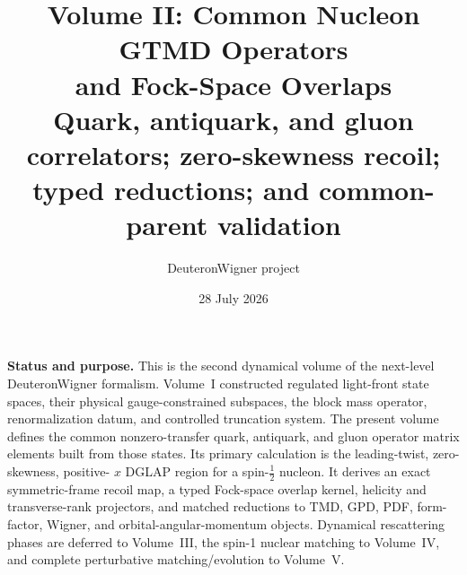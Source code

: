 \documentclass[11pt]{article}
\title{\vspace{-1.0cm}
{\color{navy}\bfseries Volume II: Common Nucleon GTMD Operators\\[2mm]
and Fock-Space Overlaps}\\[4mm]
\large Quark, antiquark, and gluon correlators; zero-skewness recoil;\\
typed reductions; and common-parent validation}
\author{DeuteronWigner project}
\date{28 July 2026}
\begin{document}
\maketitle

\begin{center}
\begin{minipage}{0.94\textwidth}
\colorbox{softblue}{\parbox{0.96\textwidth}{
\textbf{Status and purpose.}
This is the second dynamical volume of the next-level DeuteronWigner
formalism.  Volume~I constructed regulated light-front state spaces, their
physical gauge-constrained subspaces, the block mass operator,
renormalization datum, and controlled truncation system.  The present volume
defines the common nonzero-transfer quark, antiquark, and gluon operator
matrix elements built from those states.  Its primary calculation is the
leading-twist, zero-skewness, positive-
\(x\) DGLAP region for a spin-\(\tfrac12\) nucleon.  It derives an exact
symmetric-frame recoil map, a typed Fock-space overlap kernel, helicity and
transverse-rank projectors, and matched reductions to TMD, GPD, PDF,
form-factor, Wigner, and orbital-angular-momentum objects.  Dynamical
rescattering phases are deferred to Volume~III, the spin-1 nuclear matching
to Volume~IV, and complete perturbative matching/evolution to Volume~V.
}}
\end{minipage}
\end{center}
\end{document}
